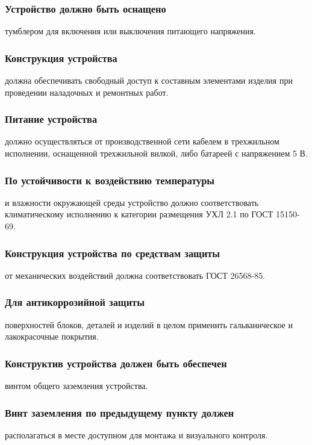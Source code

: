 \documentclass[a4paper]{bsuir-tor}
\begin{document}
  \subsubsection{Устройство должно быть оснащено}
  тумблером для включения или выключения питающего напряжения.

  \subsubsection{Конструкция устройства}
  должна обеспечивать свободный доступ к составным элементами изделия
  при проведении наладочных и ремонтных работ.

  \subsubsection{Питание устройства} должно осуществляться от
  производственной сети кабелем в трехжильном исполнении, оснащенной
  трехжильной вилкой, либо батареей с напряжением 5 В.

  \subsubsection{По устойчивости к воздействию температуры}
  и влажности окружающей среды устройство должно соответствовать
  климатическому исполнению к  категории размещения УХЛ 2.1 по
  ГОСТ 15150-69.

  \subsubsection{Конструкция устройства по средствам защиты}
  от механических воздействий должна соответствовать ГОСТ 26568-85.
  
  \subsubsection{Для антикоррозийной защиты }
  поверхностей блоков, деталей и изделий в целом применить
  гальваническое и лакокрасочные покрытия.
  
  \subsubsection{Конструктив устройства должен быть обеспечен}
  винтом общего заземления устройства.
  
  \subsubsection{Винт заземления по предыдущему пункту должен }
  располагаться в месте доступном для монтажа и визуального контроля.
\end{document}
